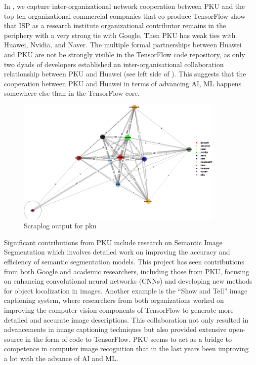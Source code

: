 \documentclass[CHICAGO,Times1COL]{WileyNJDv5} %
\begin{document}
In , we capture inter-organizational network cooperation  between 
PKU and the top ten organizational commercial companies that co-produce TensorFlow show that ISP as a research institute organizational contributor remains in the periphery with a very strong tie with Google. Then PKU has weak ties with Huawei, Nvidia, and Naver. The multiple formal partnerships between Huawei and PKU are not be strongly visible in the TensorFlow code repository, as only two dyads of developers established an inter-organisational collaboration relationship between PKU and Huawei (see left side of ). This suggests that the cooperation between PKU and Huawei in terms of advancing \ac{AI}, \ac{ML} happens somewhere else than in the TensorFlow core. 






\begin{figure}[h]
\centering
\includegraphics[keepaspectratio=true,width=0.9\textwidth]{./Figures/noo/pku_cropped.pdf}
\caption{Scraplog output for pku}
\label{figpku}
\end{figure}



Significant contributions from PKU include research on Semantic Image Segmentation which involves detailed work on improving the accuracy and efficiency of semantic segmentation models. This project has seen contributions from both Google and academic researchers, including those from PKU, focusing on enhancing convolutional neural networks (CNNs) and developing new methods for object localization in images​. Another example is the ``Show and Tell'' image captioning system, where researchers from both organizations worked on improving the computer vision components of TensorFlow to generate more detailed and accurate image descriptions. This collaboration not only resulted in advancements in image captioning techniques but also provided extensive open-source in the form of code to TensorFlow.  PKU seems to act as a bridge to competence in computer image recognition that in the last years been improving a lot with the advance of \ac{AI} and \ac{ML}.
\end{document}
